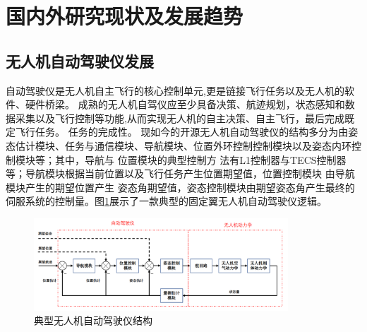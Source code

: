 \section{国内外研究现状及发展趋势}
\subsection{无人机自动驾驶仪发展}
自动驾驶仪是无人机自主飞行的核心控制单元,更是链接飞行任务以及无人机的软件、硬件桥梁。
成熟的无人机自驾仪应至少具备决策、航迹规划，状态感知和数据采集以及飞行控制等功能,从而实现无人机的自主决策、自主飞行，最后完成既定飞行任务。
任务的完成性。\cite{LiuLi2010}
现如今的开源无人机自动驾驶仪的结构多分为由姿态估计模块、任务与通信模块、导航模块、位置外环控制控制模块以及姿态内环控制模块等；其中，导航与
位置模块的典型控制方
法有L1控制器\cite{Park_2004}与TECS控制器等\cite{Lambregts1983Vertical}；导航模块根据当前位置以及飞行任务产生位置期望值，位置控制模块
由导航模块产生的期望位置产生
姿态角期望值，姿态控制模块由期望姿态角产生最终的伺服系统的控制量。图\ref{fig-c1-autopilot}展示了一款典型的固定翼无人机自动驾驶仪逻辑。
\begin{figure}[H]
    \centering
    \includegraphics[width=0.85\textwidth]{figures/c1/autopilot_struct}
    \caption{典型无人机自动驾驶仪结构}\label{fig-c1-autopilot}
\end{figure}
